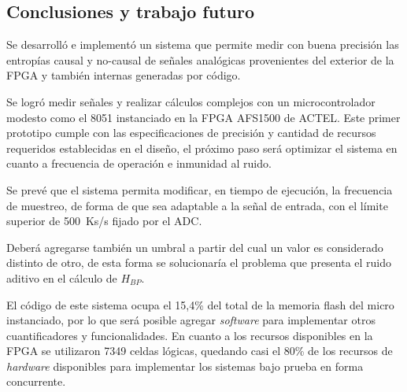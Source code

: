 \subsection{Conclusiones y trabajo futuro}
\label{sec:conclusiones}

Se desarrolló e implementó un sistema que permite medir con buena precisión las entropías causal y no-causal de señales analógicas provenientes del exterior de la FPGA y también internas generadas por código.

Se logró medir señales y realizar cálculos complejos con un microcontrolador modesto como el 8051 instanciado en la FPGA AFS1500 de ACTEL.
Este primer prototipo cumple con las especificaciones de precisión y cantidad de recursos requeridos establecidas en el diseño, el próximo paso será optimizar el sistema en cuanto a frecuencia de operación e inmunidad al ruido.

Se prevé que el sistema permita modificar, en tiempo de ejecución, la frecuencia de muestreo, de forma de que sea adaptable a la señal de entrada, con el límite superior de 500~Ks/s fijado por el ADC.

Deberá agregarse también un umbral a partir del cual un valor es considerado distinto de otro, de esta forma se solucionaría el problema que presenta el ruido aditivo en el cálculo de $H_{BP}$.

El código de este sistema ocupa el 15,4\% del total de la memoria flash del micro instanciado, por lo que será posible agregar \textit{software} para implementar otros cuantificadores y funcionalidades.
En cuanto a los recursos disponibles en la FPGA se utilizaron 7349 celdas lógicas, quedando casi el 80\% de los recursos de \textit{hardware} disponibles para implementar los sistemas bajo prueba en forma concurrente.